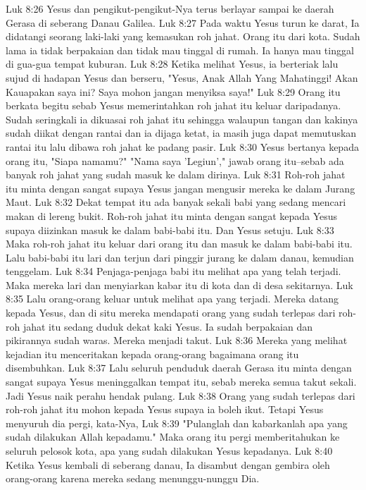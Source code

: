 Luk 8:26  Yesus dan pengikut-pengikut-Nya terus berlayar sampai ke daerah Gerasa di seberang Danau Galilea.
Luk 8:27  Pada waktu Yesus turun ke darat, Ia didatangi seorang laki-laki yang kemasukan roh jahat. Orang itu dari kota. Sudah lama ia tidak berpakaian dan tidak mau tinggal di rumah. Ia hanya mau tinggal di gua-gua tempat kuburan.
Luk 8:28  Ketika melihat Yesus, ia berteriak lalu sujud di hadapan Yesus dan berseru, "Yesus, Anak Allah Yang Mahatinggi! Akan Kauapakan saya ini? Saya mohon jangan menyiksa saya!"
Luk 8:29  Orang itu berkata begitu sebab Yesus memerintahkan roh jahat itu keluar daripadanya. Sudah seringkali ia dikuasai roh jahat itu sehingga walaupun tangan dan kakinya sudah diikat dengan rantai dan ia dijaga ketat, ia masih juga dapat memutuskan rantai itu lalu dibawa roh jahat ke padang pasir.
Luk 8:30  Yesus bertanya kepada orang itu, "Siapa namamu?" "Nama saya 'Legiun'," jawab orang itu--sebab ada banyak roh jahat yang sudah masuk ke dalam dirinya.
Luk 8:31  Roh-roh jahat itu minta dengan sangat supaya Yesus jangan mengusir mereka ke dalam Jurang Maut.
Luk 8:32  Dekat tempat itu ada banyak sekali babi yang sedang mencari makan di lereng bukit. Roh-roh jahat itu minta dengan sangat kepada Yesus supaya diizinkan masuk ke dalam babi-babi itu. Dan Yesus setuju.
Luk 8:33  Maka roh-roh jahat itu keluar dari orang itu dan masuk ke dalam babi-babi itu. Lalu babi-babi itu lari dan terjun dari pinggir jurang ke dalam danau, kemudian tenggelam.
Luk 8:34  Penjaga-penjaga babi itu melihat apa yang telah terjadi. Maka mereka lari dan menyiarkan kabar itu di kota dan di desa sekitarnya.
Luk 8:35  Lalu orang-orang keluar untuk melihat apa yang terjadi. Mereka datang kepada Yesus, dan di situ mereka mendapati orang yang sudah terlepas dari roh-roh jahat itu sedang duduk dekat kaki Yesus. Ia sudah berpakaian dan pikirannya sudah waras. Mereka menjadi takut.
Luk 8:36  Mereka yang melihat kejadian itu menceritakan kepada orang-orang bagaimana orang itu disembuhkan.
Luk 8:37  Lalu seluruh penduduk daerah Gerasa itu minta dengan sangat supaya Yesus meninggalkan tempat itu, sebab mereka semua takut sekali. Jadi Yesus naik perahu hendak pulang.
Luk 8:38  Orang yang sudah terlepas dari roh-roh jahat itu mohon kepada Yesus supaya ia boleh ikut. Tetapi Yesus menyuruh dia pergi, kata-Nya,
Luk 8:39  "Pulanglah dan kabarkanlah apa yang sudah dilakukan Allah kepadamu." Maka orang itu pergi memberitahukan ke seluruh pelosok kota, apa yang sudah dilakukan Yesus kepadanya.
Luk 8:40  Ketika Yesus kembali di seberang danau, Ia disambut dengan gembira oleh orang-orang karena mereka sedang menunggu-nunggu Dia.
